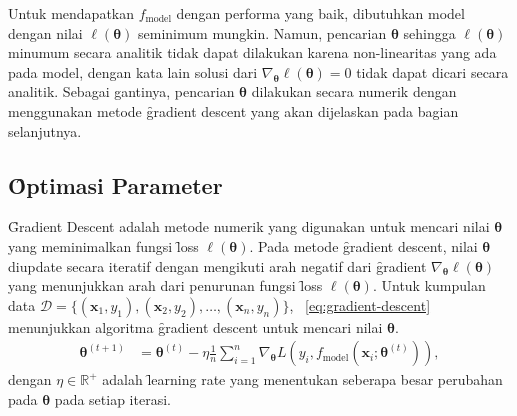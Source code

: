     Untuk mendapatkan $f_\text{model}$ dengan performa yang baik, dibutuhkan model dengan nilai $\ell(\bm{\theta})$ seminimum mungkin. Namun, pencarian $\bm{\theta}$ sehingga $ \ell (\bm{\theta})$ minumum secara analitik tidak dapat dilakukan karena non-linearitas yang ada pada model, dengan kata lain solusi dari $\nabla_{\bm{\theta}} \ell(\bm{\theta}) = 0$ tidak dapat dicari secara analitik. Sebagai gantinya, pencarian $\bm{\theta}$ dilakukan secara numerik dengan menggunakan metode \f{gradient descent} yang akan dijelaskan pada bagian selanjutnya.
    
\subsection{\f{Optimasi} Parameter}

    \f{Gradient Descent} adalah metode numerik yang digunakan untuk mencari nilai $\bm{\theta}$ yang meminimalkan fungsi \f{loss} $\ell(\bm{\theta})$. Pada metode \f{gradient descent}, nilai $\bm{\theta}$ diupdate secara iteratif dengan mengikuti arah negatif dari \f{gradient} $\nabla_{\bm{\theta}} \ell(\bm{\theta})$ yang menunjukkan arah dari penurunan fungsi \f{loss} $\ell(\bm{\theta})$. Untuk kumpulan data $\mathcal{D} = \{(\mathbf{x}_1, y_1), (\mathbf{x}_2, y_2), \dots, (\mathbf{x}_n, y_n)\}$, \equ~\ref{eq:gradient-descent} menunjukkan algoritma \f{gradient descent} untuk mencari nilai $\bm{\theta}$.
    \begin{align}
        \label{eq:gradient-descent}
        \bm{\theta}^{(t+1)} &= \bm{\theta}^{(t)} - \eta \frac{1}{n} \sum_{i=1}^{n} \nabla_{\bm{\theta}} L(y_i, f_{\text{model}}(\mathbf{x}_i; \bm{\theta}^{(t)})),
    \end{align}
    dengan $\eta \in \mathbb{R}^+$ adalah \f{learning rate} yang menentukan seberapa besar perubahan pada $\bm{\theta}$ pada setiap iterasi.

